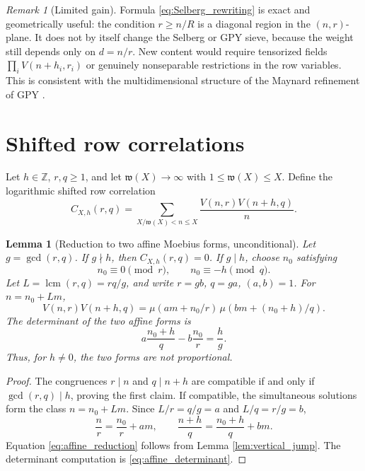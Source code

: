 \documentclass[11pt]{amsart}
\numberwithin{equation}{section}
\theoremstyle{plain}
\newtheorem{lemma}[theorem]{Lemma}
\theoremstyle{definition}
\theoremstyle{remark}
\newtheorem{remark}[theorem]{Remark}
\newcommand{\mob}{\mu}
\newcommand{\Vjump}{V}
\begin{document}
\begin{remark}[Limited gain]
\label{rem:selberg_limited_gain}
Formula \eqref{eq:Selberg_rewriting} is exact and geometrically useful: the condition \(r\ge n/R\) is a diagonal region in the \((n,r)\)-plane.  It does not by itself change the Selberg or GPY sieve, because the weight still depends only on \(d=n/r\).  New content would require tensorized fields \(\prod_i \Vjump(n+h_i,r_i)\) or genuinely nonseparable restrictions in the row variables.  This is consistent with the multidimensional structure of the Maynard refinement of GPY \cite{GPY2009,Maynard2015}.
\end{remark}

\section{Shifted row correlations}
\label{sec:shifted_correlations}

Let \(h\in\mathbb Z\), \(r,q\ge1\), and let \(\mathfrak w(X)\to\infty\) with \(1\le\mathfrak w(X)\le X\).  Define the logarithmic shifted row correlation
\begin{equation}
C_{X,h}(r,q)=\sum_{X/\mathfrak w(X)<n\le X}\frac{\Vjump(n,r)\Vjump(n+h,q)}{n}.
\label{eq:C_X_h_def}
\end{equation}

\begin{lemma}[Reduction to two affine Moebius forms, unconditional]
\label{lem:affine_reduction}
Let \(g=\gcd(r,q)\).  If \(g\nmid h\), then \(C_{X,h}(r,q)=0\).  If \(g\mid h\), choose \(n_0\) satisfying
\begin{equation}
n_0\equiv0\pmod r,
\qquad
n_0\equiv-h\pmod q.
\label{eq:n0_congruences}
\end{equation}
Let \(L=\operatorname{lcm}(r,q)=rq/g\), and write \(r=gb\), \(q=ga\), \((a,b)=1\).  For \(n=n_0+Lm\),
\begin{equation}
\Vjump(n,r)\Vjump(n+h,q)
=\mob(am+n_0/r)\,\mob(bm+(n_0+h)/q).
\label{eq:affine_reduction}
\end{equation}
The determinant of the two affine forms is
\begin{equation}
a\frac{n_0+h}{q}-b\frac{n_0}{r}=\frac{h}{g}.
\label{eq:affine_determinant}
\end{equation}
Thus, for \(h\ne0\), the two forms are not proportional.
\end{lemma}

\begin{proof}
The congruences \(r\mid n\) and \(q\mid n+h\) are compatible if and only if \(\gcd(r,q)\mid h\), proving the first claim.  If compatible, the simultaneous solutions form the class \(n=n_0+Lm\).  Since \(L/r=q/g=a\) and \(L/q=r/g=b\),
\begin{equation}
\frac{n}{r}=\frac{n_0}{r}+am,
\qquad
\frac{n+h}{q}=\frac{n_0+h}{q}+bm.
\label{eq:affine_forms_values}
\end{equation}
Equation \eqref{eq:affine_reduction} follows from Lemma \ref{lem:vertical_jump}.  The determinant computation is \eqref{eq:affine_determinant}.
\end{proof}
\end{document}
